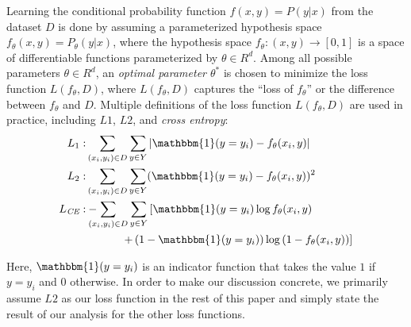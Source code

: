 Learning the conditional probability function $f(x,y) = P(y|x)$ from the dataset $D$ is done by assuming a parameterized hypothesis space $f_{\theta}(x,y) = P_{\theta}(y|x)$, where the hypothesis space $f_{\theta}: (x, y) \rightarrow [0,1]$ is a space of differentiable functions parameterized by $\theta \in R^d$. Among all possible parameters $\theta \in R^d$, an \emph{optimal parameter $\theta^*$} is chosen to minimize the loss function $L(f_{\theta}, D)$, where $L(f_{\theta}, D)$ captures the ``loss of $f_{\theta}$'' or the difference between $f_{\theta}$ and $D$. Multiple definitions of the loss function $L(f_{\theta},D)$ are used in practice, including $L1$, $L2$, and \emph{cross entropy}:
\vspace{-0.7ex}
\begin{align}L_1:& \sum_{(x_i,y_i)\in D} \sum_{y \in Y} \vert\mathbbm{1}(y=y_i) - f_{\theta}(x_i, y)\vert\\
L_2:& \sum_{(x_i,y_i)\in D} \sum_{y \in Y} (\mathbbm{1}(y=y_i) - f_{\theta}(x_i, y))^2\\
L_{\textit{CE}}:&
-\!\!\!\!\!\!\sum_{(x_i,y_i)\in D} \sum_{y \in Y} \left[\mathbbm{1}(y=y_i) \log f_{\theta}(x_i, y) \right. \nonumber\\
&\left. \qquad\,\,\,\,\,\,\,+\left(1 - \mathbbm{1}(y=y_i)\right) \log\left(1 - f_{\theta}(x_i, y)\right)\right] 
\end{align}

Here, $\mathbbm{1}(y=y_i)$ is an indicator function that takes the value $1$ if $y = y_i$ and $0$ otherwise. In order to make our discussion concrete, we primarily assume $L2$ as our loss function in the rest of this paper and simply state the result of our analysis for the other loss functions. 

